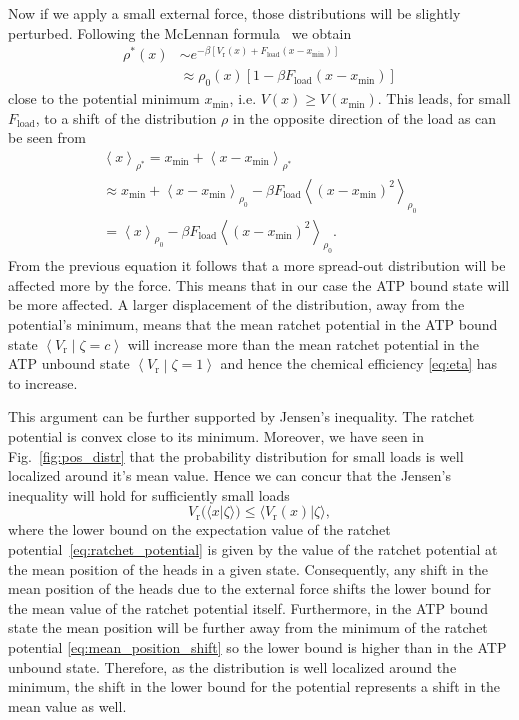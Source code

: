 \documentclass[aps,pre,twocolumn,showpacs,showkeys,superscriptaddress,floatfix]{revtex4-1}
\begin{document}
Now if we apply a small external force, those distributions will be slightly perturbed. 
Following the McLennan formula~\cite{Maes2010} we obtain  
\begin{align*}
\rho^*(x) 
&\sim e^{-\beta \left[V_\text{r}(x) + F_\text{load} \left( x - x_\text{min} \right) \right]} \\
&\approx \rho_0(x) \left[1 - \beta F_\text{load} \left( x - x_\text{min} \right) \right]
\end{align*}
close to the potential minimum $x_\text{min}$, i.e. $V(x) \ge V(x_\text{min})$. 
This leads, for small $F_\text{load}$, to a shift of the distribution $\rho$ in the opposite direction of the load
as can be seen from 
\begin{multline}
\left\langle x \right\rangle_{\rho^*} 
= x_\text{min} + \left\langle x - x_\text{min} \right\rangle_{\rho^*}
\\
\approx x_\text{min} + \left\langle x - x_\text{min} \right\rangle_{\rho_0} 
- \beta F_\text{load} \left\langle \left( x - x_\text{min} \right)^2 \right\rangle_{\rho_0} 
\\
= \left\langle x \right\rangle_{\rho_0}
- \beta F_\text{load} \left\langle \left( x - x_\text{min} \right)^2 \right\rangle_{\rho_0} .
\label{eq:mean_position_shift}
\end{multline}
From the previous equation it follows that a more spread-out distribution will be affected more by the force.
This means that in our case the ATP bound state will be more affected.
A larger displacement of the distribution, away from the potential's minimum, 
means that the mean ratchet potential in the ATP bound state $\left\langle V_\text{r} \middle| \zeta = c \right\rangle$ will increase more than the mean ratchet potential in the ATP unbound state $\left\langle V_\text{r} \middle| \zeta = 1 \right\rangle$ and hence the chemical efficiency \eqref{eq:eta} has to increase. 

This argument can be further supported by Jensen's inequality.
The ratchet potential is convex close to its minimum. 
Moreover, we have seen in Fig.~\ref{fig:pos_distr} that the probability distribution for small loads is well localized around it's mean value.
Hence we can concur that the Jensen's inequality will hold for sufficiently small loads  
\begin{equation*}
V_\text{r}(\langle x | \zeta \rangle) \leq \langle V_\text{r}(x) | \zeta \rangle , 
\end{equation*} 
where the lower bound on the expectation value of the ratchet potential~\eqref{eq:ratchet_potential} is given by the value of the ratchet potential at the mean position of the heads in a given state. 
Consequently, any shift in the mean position of the heads due to the external force shifts the lower bound for the mean value of the ratchet potential itself.
Furthermore, in the ATP bound state the mean position will be further away from the minimum of the ratchet potential \eqref{eq:mean_position_shift} so the lower bound is higher than in the ATP unbound state.
Therefore, as the distribution is well localized around the minimum, the shift in the lower bound for the potential represents a shift in the mean value as well. 
\end{document}
